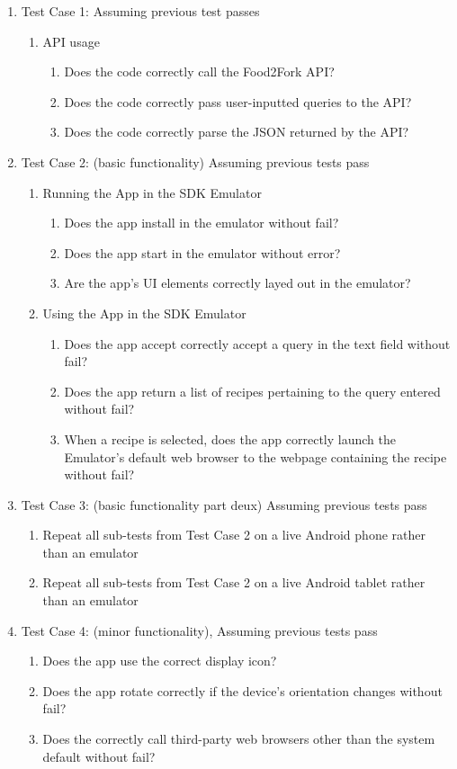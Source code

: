 \documentclass[a4paper,11pt]{article}
\begin{document}
\begin{itemize}
\begin{enumerate}
\item Test Case 1: Assuming previous test passes
	\begin{enumerate}
	\item API usage
		\begin{enumerate}
		\item Does the code correctly call the Food2Fork API?
		\item Does the code correctly pass user-inputted queries to the API?
		\item Does the code correctly parse the JSON returned by the API?
		\end{enumerate}
	\end{enumerate}
\item Test Case 2: (basic functionality) Assuming previous tests pass
	\begin{enumerate}
	\item Running the App in the SDK Emulator
		\begin{enumerate}
		\item Does the app install in the emulator without fail?
		\item Does the app start in the emulator without error?
		\item Are the app's UI elements correctly layed out in the emulator?
		\end{enumerate}
	\item Using the App in the SDK Emulator
		\begin{enumerate}
		\item Does the app accept correctly accept a query in the text field without fail?
		\item Does the app return a list of recipes pertaining to the query entered without fail?
		\item When a recipe is selected, does the app correctly launch the Emulator's default web browser to the webpage containing the recipe without fail?
		\end{enumerate}
	\end{enumerate}
\item Test Case 3: (basic functionality part deux) Assuming previous tests pass
	\begin{enumerate}
	\item Repeat all sub-tests from Test Case 2 on a live Android phone rather than an emulator
	\item Repeat all sub-tests from Test Case 2 on a live Android tablet rather than an emulator
	\end{enumerate}
\item Test Case 4: (minor functionality), Assuming previous tests pass
	\begin{enumerate}
	\item Does the app use the correct display icon?
	\item Does the app rotate correctly if the device's orientation changes without fail?
	\item Does the correctly call third-party web browsers other than the system default without fail?
	\end{enumerate}
\end{enumerate}

\end{itemize}
\end{document}
